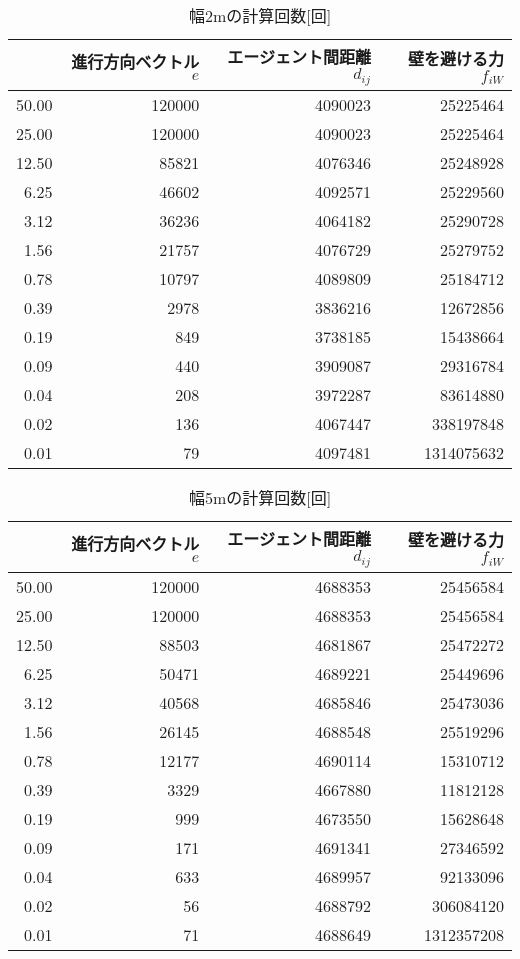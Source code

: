 \begin{table}[t]
  \centering
  \caption{幅2mの計算回数[回]}
  \label{tb:haba2_times}
  \begin{tabular}{r|r|r|r}
  \hline \hline
          & 進行方向ベクトル$e$ & エージェント間距離$d_{ij}$ & 壁を避ける力$f_{iW}$ \\ \hline
    50.00 & 120000 & 4090023 & 25225464 \\ \hline
    25.00 & 120000 & 4090023 & 25225464 \\ \hline
    12.50 & 85821 & 4076346 & 25248928 \\ \hline
    6.25 & 46602 & 4092571 & 25229560 \\ \hline
    3.12 & 36236 & 4064182 & 25290728 \\ \hline
    1.56 & 21757 & 4076729 & 25279752 \\ \hline
    0.78 & 10797 & 4089809 & 25184712 \\ \hline
    0.39 & 2978 & 3836216 & 12672856 \\ \hline
    0.19 & 849 & 3738185 & 15438664 \\ \hline
    0.09 & 440 & 3909087 & 29316784 \\ \hline
    0.04 & 208 & 3972287 & 83614880 \\ \hline
    0.02 & 136 & 4067447 & 338197848 \\ \hline
    0.01 & 79 & 4097481 & 1314075632 \\ \hline
  \end{tabular}
\end{table}

\begin{table}[t]
  \centering
  \caption{幅5mの計算回数[回]}
  \label{tb:haba5_times}
  \begin{tabular}{r|r|r|r}
  \hline \hline
    & 進行方向ベクトル$e$ & エージェント間距離$d_{ij}$ & 壁を避ける力$f_{iW}$ \\ \hline
    50.00 & 120000 & 4688353 & 25456584 \\ \hline
    25.00 & 120000 & 4688353 & 25456584 \\ \hline
    12.50 & 88503 & 4681867 & 25472272 \\ \hline
    6.25 & 50471 & 4689221 & 25449696 \\ \hline
    3.12 & 40568 & 4685846 & 25473036 \\ \hline
    1.56 & 26145 & 4688548 & 25519296 \\ \hline
    0.78 & 12177 & 4690114 & 15310712 \\ \hline
    0.39 & 3329 & 4667880 & 11812128 \\ \hline
    0.19 & 999 & 4673550 & 15628648 \\ \hline
    0.09 & 171 & 4691341 & 27346592 \\ \hline
    0.04 & 633 & 4689957 & 92133096 \\ \hline
    0.02 & 56 & 4688792 & 306084120 \\ \hline
    0.01 & 71 & 4688649 & 1312357208 \\ \hline
  \end{tabular}
\end{table}


